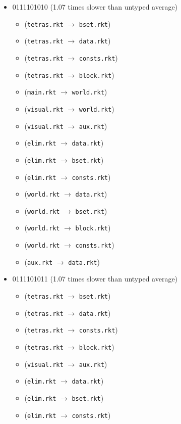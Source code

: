 \documentclass{article}
\newcommand{\mono}[1]{\texttt{#1}}
\begin{document}
\begin{itemize}
\begin{itemize}
  \end{itemize}
\item 0111101010 (1.07 times slower than untyped average)
  \begin{itemize}
  \item (\mono{tetras.rkt} $\rightarrow$ \mono{bset.rkt})
  \item (\mono{tetras.rkt} $\rightarrow$ \mono{data.rkt})
  \item (\mono{tetras.rkt} $\rightarrow$ \mono{consts.rkt})
  \item (\mono{tetras.rkt} $\rightarrow$ \mono{block.rkt})
  \item (\mono{main.rkt} $\rightarrow$ \mono{world.rkt})
  \item (\mono{visual.rkt} $\rightarrow$ \mono{world.rkt})
  \item (\mono{visual.rkt} $\rightarrow$ \mono{aux.rkt})
  \item (\mono{elim.rkt} $\rightarrow$ \mono{data.rkt})
  \item (\mono{elim.rkt} $\rightarrow$ \mono{bset.rkt})
  \item (\mono{elim.rkt} $\rightarrow$ \mono{consts.rkt})
  \item (\mono{world.rkt} $\rightarrow$ \mono{data.rkt})
  \item (\mono{world.rkt} $\rightarrow$ \mono{bset.rkt})
  \item (\mono{world.rkt} $\rightarrow$ \mono{block.rkt})
  \item (\mono{world.rkt} $\rightarrow$ \mono{consts.rkt})
  \item (\mono{aux.rkt} $\rightarrow$ \mono{data.rkt})
  \end{itemize}
\item 0111101011 (1.07 times slower than untyped average)
  \begin{itemize}
  \item (\mono{tetras.rkt} $\rightarrow$ \mono{bset.rkt})
  \item (\mono{tetras.rkt} $\rightarrow$ \mono{data.rkt})
  \item (\mono{tetras.rkt} $\rightarrow$ \mono{consts.rkt})
  \item (\mono{tetras.rkt} $\rightarrow$ \mono{block.rkt})
  \item (\mono{visual.rkt} $\rightarrow$ \mono{aux.rkt})
  \item (\mono{elim.rkt} $\rightarrow$ \mono{data.rkt})
  \item (\mono{elim.rkt} $\rightarrow$ \mono{bset.rkt})
  \item (\mono{elim.rkt} $\rightarrow$ \mono{consts.rkt})

\end{itemize}
\end{itemize}
\end{document}
